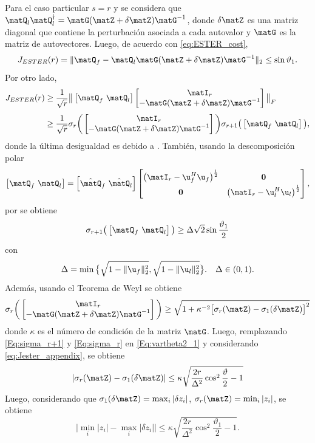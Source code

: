 Para el caso particular $s=r$ y se considera que $\matQ_l\matQ_l^\dagger = \matG(\matZ + \delta\matZ)\matG^{-1}$, donde $\delta\matZ$ es una matriz diagonal que contiene la perturbación asociada a cada autovalor y $\matG$ es la matriz de autovectores. Luego, de acuerdo con \eqref{eq:ESTER_cost},
\begin{equation} J_{ESTER}(r) = \|\matQ_f -\matQ_l\matG(\matZ+\delta\matZ)\matG^{-1}\|_2\le \sin\vartheta_1. \label{eq:Jester_appendix}\end{equation}
Por otro lado,
\begin{equation}
	\begin{aligned} 
		J_{ESTER}(r) & \ge \frac{1}{\sqrt{r}}\big\|\left[ \matQ_f\ \matQ_l\right]\begin{bmatrix} \matI_r \\ -\matG(\matZ+\delta\matZ)\matG^{-1}\end{bmatrix} \big\|_F\\[0.3em]  & \ge \frac{1}{\sqrt{r}}\sigma_r\bigg(\begin{bmatrix} \matI_r \\ -\matG(\matZ+\delta\matZ)\matG^{-1}\end{bmatrix}\bigg)\sigma_{r+1}\big(\left[ \matQ_f\ \matQ_l\right]\big),
	\end{aligned}
	\label{Eq:vartheta2_1}
\end{equation}
donde la última desigualdad es debido a \cite[Teo. 2]{WANG1997}. También, usando la descomposición polar \cite{Horn1991}
\[\left[\matQ_f\ \matQ_l\right] = \left[\hat{\matQ}_f\ \hat{\matQ}_l\right]\begin{bmatrix} \big(\matI_r-\u_f^H\u_f\big)^{\frac{1}{2}} & \mathbf{0} \\[0.3em] \mathbf{0} & \big(\matI_r-\u_l^H\u_l\big)^{\frac{1}{2}} 
\end{bmatrix},\]
por \cite{Horn1990} se obtiene
\begin{equation}
	\sigma_{r+1}\big(\left[ \matQ_f\ \matQ_l\right]\big)\ge \Delta\sqrt{2}\sin\frac{\vartheta_1}{2}
	\label{Eq:sigma_r+1}
\end{equation}
con 
\[\Delta = \min\big\{\sqrt{1-\|\u_f\|_2^2}, \sqrt{1-\|\u_l\|_2^2}\big\}. \quad \Delta\in(0,1).\]
Además, usando el Teorema de Weyl \cite{Horn1991} se obtiene
\begin{equation}
	\sigma_r\bigg(\begin{bmatrix} \matI_r \\ -\matG(\matZ+\delta\matZ)\matG^{-1}\end{bmatrix}\bigg)\ge \sqrt{1+\kappa^{-2}\big[\sigma_r(\matZ)-\sigma_1(\delta\matZ)\big]^2}
	\label{Eq:sigma_r}
\end{equation}
donde $\kappa$ es el número de condición de la matriz $\matG$. Luego, remplazando \eqref{Eq:sigma_r+1} y \eqref{Eq:sigma_r} en \eqref{Eq:vartheta2_1} y considerando  \eqref{eq:Jester_appendix}, se obtiene
\[|\sigma_r(\matZ)-\sigma_1(\delta\matZ)|\le \kappa\sqrt{\frac{2r}{\Delta^2}\cos^2\frac{\vartheta}{2}-1}\]
Luego, considerando que $\sigma_1(\delta\matZ) = \max_i|\delta z_i|$, $\sigma_r(\matZ) = \min_i|z_i|$, se obtiene
\[\big|\min_i|z_i|-\max_i|\delta z_i|\big|\le \kappa\sqrt{\frac{2r}{\Delta^2}\cos^2\frac{\vartheta_1}{2}-1}.\]

